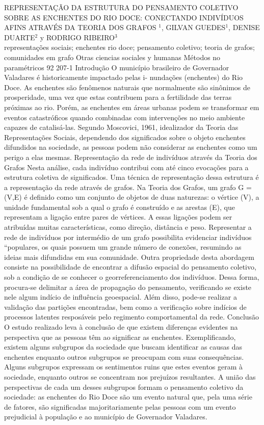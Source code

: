 \A
{REPRESENTAÇÃO DA ESTRUTURA DO PENSAMENTO COLETIVO SOBRE AS ENCHENTES DO RIO DOCE: CONECTANDO INDIVÍDUOS AFINS ATRAVÉS DA TEORIA DOS GRAFOS}
{$^1$, GILVAN GUEDES$^1$, DENISE DUARTE$^2$ y RODRIGO RIBEIRO$^3$}
{
\\}
{representações sociais; enchentes rio doce; pensamento coletivo; teoria de grafos; comunidades em grafo} 
 {Otras ciencias sociales y humanas} 
 {Métodos no paramétricos} 
 {92} 
 {207-1}
{Introdução O município brasileiro de Governador Valadares é historicamente impactado pelas i- nundações (enchentes) do Rio Doce. As enchentes são fenômenos naturais que normalmente são sinônimos de prosperidade, uma vez que estas contribuem para a fertilidade das terras próximas ao rio. Porém, as enchentes em áreas urbanas podem se transformar em eventos catastróficos quando combinadas com intervenções no meio ambiente capazes de catalisá-las. Segundo {Moscovici, 1961}, idealizador da Teoria das Representações Sociais, dependendo dos significados sobre o objeto enchentes difundidos na sociedade, as pessoas podem não considerar as enchentes como um perigo a elas mesmas. Representação da rede de indivíduos através da Teoria dos Grafos Nesta análise, cada indivíduo contribui com até cinco evocações para a estrutura coletiva de significados. Uma técnica de representação dessa estrutura é a representação da rede através de grafos. Na Teoria dos Grafos, um grafo G = (V,E) é definido como um conjunto de objetos de duas naturezas: o vértice (V), a unidade fundamental sob a qual o grafo é construído e as arestas (E), que representam a ligação entre pares de vértices. A essas ligações podem ser atribuídas muitas características, como direção, distância e peso. Representar a rede de indivíduos por intermédio de um grafo possibilita evidenciar indivíduos ``populares, os quais possuem um grande número de conexões, resumindo as ideias mais difundidas em sua comunidade. Outra propriedade desta abordagem consiste na possibilidade de encontrar a difusão espacial do pensamento coletivo, sob a condição de se conhecer o georreferenciamento dos indivíduos. Dessa forma, procura-se delimitar a área de propagação do pensamento, verificando se existe nele algum indício de influência geoespacial. Além disso, pode-se realizar a validação das partições encontradas, bem como a verificação sobre indícios de processos latentes resposáveis pelo regimento comportamental da rede. Conclusão O estudo realizado leva à conclusão de que existem diferenças evidentes na perspectiva que as pessoas têm ao significar as enchentes. Exemplificando, existem alguns subgrupos da sociedade que buscam identificar as causas das enchentes enquanto outros subgrupos se preocupam com suas consequências. Alguns subgrupos expressam os sentimentos ruins que estes eventos geram à sociedade, enquanto outros se concentram nos prejuízos resultantes. A união das perspectivas de cada um desses subgrupos formam o pensamento coletivo da sociedade: as enchentes do Rio Doce são um evento natural que, pela uma série de fatores, são significadas majoritariamente pelas pessoas com um evento prejudicial à população e ao município de Governador Valadares.}
